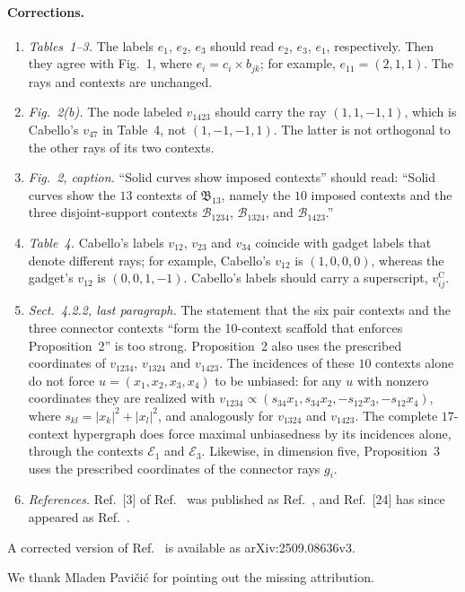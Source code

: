 \documentclass[%
  reprint,
  superscriptaddress,
  amsmath,amssymb,
  aps,pra,
  longbibliography,
  floatfix
]{revtex4-2}
\begin{document}
\paragraph*{Corrections.}
\begin{enumerate}
\item \emph{Tables~1--3.}
The labels $e_1$, $e_2$, $e_3$ should read $e_2$, $e_3$, $e_1$, respectively.
Then they agree with Fig.~1, where $e_i=c_i\times b_{jk}$; for example, $e_{11}=(2,1,1)$.
The rays and contexts are unchanged.

\item \emph{Fig.~2(b).}
The node labeled $v_{1423}$ should carry the ray $(1,1,-1,1)$, which is Cabello's $v_{47}$ in Table~4, not $(1,-1,-1,1)$.
The latter is not orthogonal to the other rays of its two contexts.

\item \emph{Fig.~2, caption.}
``Solid curves show imposed contexts'' should read: ``Solid curves show the $13$ contexts of $\mathfrak{B}_{13}$, namely the $10$ imposed contexts and the three disjoint-support contexts $\mathcal{B}_{1234}$, $\mathcal{B}_{1324}$, and $\mathcal{B}_{1423}$.''

\item \emph{Table~4.}
Cabello's labels $v_{12}$, $v_{23}$ and $v_{34}$ coincide with gadget labels that denote different rays; for example, Cabello's $v_{12}$ is $(1,0,0,0)$, whereas the gadget's $v_{12}$ is $(0,0,1,-1)$.
Cabello's labels should carry a superscript, $v^{\mathrm{C}}_{ij}$.

\item \emph{Sect.~4.2.2, last paragraph.}
The statement that the six pair contexts and the three connector contexts ``form the 10-context scaffold that enforces Proposition~2'' is too strong.
Proposition~2 also uses the prescribed coordinates of $v_{1234}$, $v_{1324}$ and $v_{1423}$.
The incidences of these $10$ contexts alone do not force $u=(x_1,x_2,x_3,x_4)$ to be unbiased: for any $u$ with nonzero coordinates they are realized with $v_{1234}\propto(s_{34}x_1,s_{34}x_2,-s_{12}x_3,-s_{12}x_4)$, where $s_{kl}=|x_k|^2+|x_l|^2$, and analogously for $v_{1324}$ and $v_{1423}$.
The complete $17$-context hypergraph does force maximal unbiasedness by its incidences alone, through the contexts $\mathcal{E}_1$ and $\mathcal{E}_3$.
Likewise, in dimension five, Proposition~3 uses the prescribed coordinates of the connector rays $g_i$.

\item \emph{References.}
Ref.~[3] of Ref.~\cite{svozil-2025-MYOCHS} was published as Ref.~\cite{2024-cabello-trandafir0}, and Ref.~[24] has since appeared as Ref.~\cite{mcnulty2024mutually}.
\end{enumerate}

A corrected version of Ref.~\cite{svozil-2025-MYOCHS} is available as arXiv:2509.08636v3.

\begin{acknowledgments}
We thank Mladen Pavi\v{c}i\'{c} for pointing out the missing attribution.
\end{acknowledgments}


\end{document}
